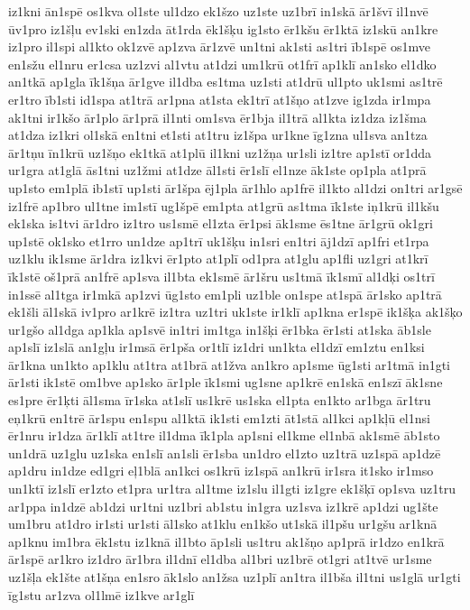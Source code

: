 {iz1kni
ān1spē
os1kva
ol1ste
ul1dzo
ek1šzo
uz1ste
uz1brī
in1skā
ār1švī
il1nvē
ūv1pro
iz1šļu
ev1ski
en1zda
āt1rda
ēk1šķu
ig1sto
ēr1kšu
ēr1ktā
iz1skū
an1kre
iz1pro
il1spi
al1kto
ok1zvē
ap1zva
ār1zvē
un1tni
ak1sti
as1tri
īb1spē
os1mve
en1sžu
el1nru
er1csa
uz1zvi
al1vtu
at1dzi
um1krū
ot1frī
ap1klī
an1sko
el1dko
an1tkā
ap1gla
īk1šņa
ār1gve
il1dba
es1tma
uz1sti
at1drū
ul1pto
uk1smi
as1trē
er1tro
īb1sti
id1spa
at1trā
ar1pna
at1sta
ek1trī
at1šņo
at1zve
ig1zda
ir1mpa
ak1tni
ir1kšo
ār1plo
ār1prā
il1nti
om1sva
ēr1bja
il1trā
al1kta
iz1dza
iz1šma
at1dza
iz1kri
ol1skā
en1tni
et1sti
at1tru
iz1špa
ur1kne
īg1zna
ul1sva
an1tza
ār1tņu
īn1krū
uz1šņo
ek1tkā
at1plū
il1kni
uz1žņa
ur1sli
iz1tre
ap1stī
or1dda
ur1gra
at1glā
ās1tni
uz1žmi
at1dze
āl1sti
ēr1slī
el1nze
āk1ste
op1pla
at1prā
up1sto
em1plā
ib1stī
up1sti
ār1špa
ēj1pla
ār1hlo
ap1frē
il1kto
al1dzi
on1tri
ar1gsē
iz1frē
ap1bro
ul1tne
im1stī
ug1špē
em1pta
at1grū
as1tma
īk1ste
iņ1krū
il1kšu
ek1ska
is1tvi
ār1dro
iz1tro
us1smē
el1zta
ēr1psi
āk1sme
ēs1tne
ār1grū
ok1gri
up1stē
ok1sko
et1rro
un1dze
ap1trī
uk1šķu
in1sri
en1tri
āj1dzī
ap1fri
et1rpa
uz1klu
ik1sme
ār1dra
iz1kvi
ēr1pto
at1plī
od1pra
at1glu
ap1fli
uz1gri
at1krī
īk1stē
oš1prā
an1frē
ap1sva
il1bta
ek1smē
ār1šru
us1tmā
īk1smī
al1dķi
os1trī
in1ssē
al1tga
ir1mkā
ap1zvi
ūg1sto
em1pli
uz1ble
on1spe
at1spā
ār1sko
ap1trā
ek1šli
āl1skā
iv1pro
ar1krē
iz1tra
uz1tri
uk1ste
ir1klī
ap1kna
er1spē
ik1šķa
ak1šķo
ur1gšo
al1dga
ap1kla
ap1svē
in1tri
im1tga
in1šķi
ēr1bka
ēr1sti
at1ska
āb1sle
ap1slī
iz1slā
an1gļu
ir1msā
ēr1pša
or1tlī
iz1dri
un1kta
el1dzī
em1ztu
en1ksi
ār1kna
un1kto
ap1klu
at1tra
at1brā
at1žva
an1kro
ap1sme
ūg1sti
ar1tmā
in1gti
ār1sti
ik1stē
om1bve
ap1sko
ār1ple
īk1smi
ug1sne
ap1krē
en1skā
en1szī
āk1sne
es1pre
ēr1ķti
āl1sma
īr1ska
at1slī
us1krē
us1ska
el1pta
en1kto
ar1bga
ār1tru
eņ1krū
en1trē
ār1spu
en1spu
al1ktā
ik1sti
em1zti
āt1stā
al1kci
ap1kļū
el1nsi
ēr1nru
ir1dza
ār1klī
at1tre
il1dma
īk1pla
ap1sni
el1kme
el1nbā
ak1smē
āb1sto
un1drā
uz1glu
uz1ska
en1slī
an1sli
ēr1sba
un1dro
el1zto
uz1trā
uz1spā
ap1dzē
ap1dru
in1dze
ed1gri
eļ1blā
an1kci
os1krū
iz1spā
an1krū
ir1sra
it1sko
ir1mso
un1ktī
iz1slī
er1zto
et1pra
ur1tra
al1tme
iz1slu
il1gti
iz1gre
ek1šķī
op1sva
uz1tru
ar1ppa
in1dzē
ab1dzi
ur1tni
uz1bri
ab1stu
in1gra
uz1sva
iz1krē
ap1dzi
ug1šte
um1bru
at1dro
ir1sti
ur1sti
āl1sko
at1klu
en1kšo
ut1skā
il1pšu
ur1gšu
ar1knā
ap1knu
im1bra
ēk1stu
iz1knā
il1bto
āp1sli
us1tru
ak1šņo
ap1prā
ir1dzo
en1krā
ār1spē
ar1kro
iz1dro
ār1bra
il1dnī
el1dba
al1bri
uz1brē
ot1gri
at1tvē
ur1sme
uz1šļa
ek1šte
at1šņa
en1sro
āk1slo
an1žsa
uz1plī
an1tra
il1bša
il1tni
us1glā
ur1gti
īg1stu
ar1zva
ol1lmē
iz1kve
ar1glī
}
